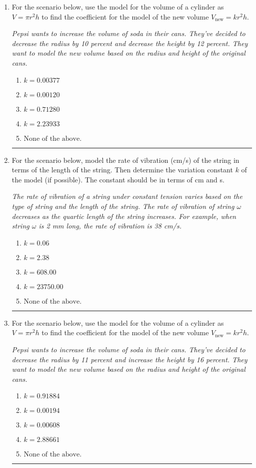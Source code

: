 \documentclass[14pt]{extbook}
\newcommand{\litem}[1]{\item#1\hspace*{-1cm}\rule{\textwidth}{0.4pt}}
\begin{document}
\begin{enumerate}
{\begin{enumerate}[label=\Alph*.]
\end{enumerate} }
\litem{
For the scenario below, use the model for the volume of a cylinder as $V = \pi r^2 h$ to find the coefficient for the model of the new volume $V_{\text{new}} = k r^2 h$.
\begin{center}
    \textit{ Pepsi wants to increase the volume of soda in their cans. They've decided to decrease the radius by 10 percent and decrease the height by 12 percent. They want to model the new volume based on the radius and height of the original cans. }
\end{center}
\begin{enumerate}[label=\Alph*.]
\item \( k = 0.00377 \)
\item \( k = 0.00120 \)
\item \( k = 0.71280 \)
\item \( k = 2.23933 \)
\item \( \text{None of the above.} \)

\end{enumerate} }
\litem{
For the scenario below, model the rate of vibration (cm/s) of the string in terms of the length of the string. Then determine the variation constant $k$ of the model (if possible). The constant should be in terms of cm and s.
\begin{center}
    \textit{ The rate of vibration of a string under constant tension varies based on the type of string and the length of the string. The rate of vibration of string $\omega$ decreases as the quartic length of the string increases. For example, when string $\omega$ is 2 mm long, the rate of vibration is 38 cm/s. }
\end{center}
\begin{enumerate}[label=\Alph*.]
\item \( k = 0.06 \)
\item \( k = 2.38 \)
\item \( k = 608.00 \)
\item \( k = 23750.00 \)
\item \( \text{None of the above.} \)

\end{enumerate} }
\litem{
For the scenario below, use the model for the volume of a cylinder as $V = \pi r^2 h$ to find the coefficient for the model of the new volume $V_{\text{new}} = k r^2 h$.
\begin{center}
    \textit{ Pepsi wants to increase the volume of soda in their cans. They've decided to decrease the radius by 11 percent and increase the height by 16 percent. They want to model the new volume based on the radius and height of the original cans. }
\end{center}
\begin{enumerate}[label=\Alph*.]
\item \( k = 0.91884 \)
\item \( k = 0.00194 \)
\item \( k = 0.00608 \)
\item \( k = 2.88661 \)
\item \( \text{None of the above.} \)


\end{enumerate}}
\end{enumerate}
\end{document}
